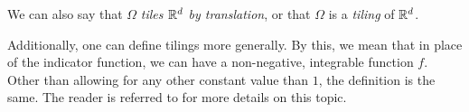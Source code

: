 \documentclass[../thesis.tex]{subfiles}
\begin{document}
\begin{remark}
    We can also say that $\Omega$ \emph{tiles $\mathbb{R}^d$ by translation}, or that $\Omega$ is a \emph{tiling} of $\mathbb{R}^d$. 
\end{remark}
\begin{remark}
    Additionally, one can define tilings more generally. By this, we mean that in place of the indicator function, we can have a non-negative, integrable function $f$. Other than allowing for any other constant value than $1$, the definition is the same. The reader is referred to \cite{kolountzakisTilingsTranslation2010,kolountzakisStructureTilingsLine1996} for more details on this topic.
\end{remark}
\end{document}
